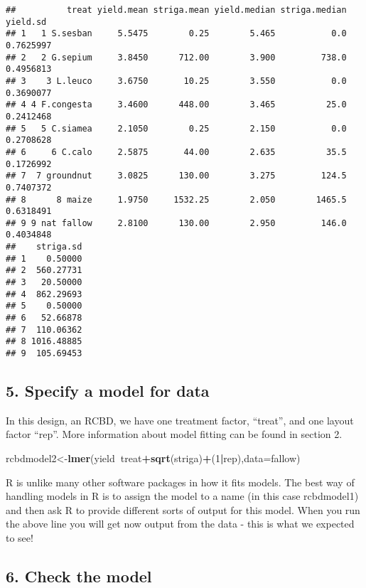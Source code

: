 \documentclass[]{book}
\newenvironment{Shaded}{\begin{snugshade}}{\end{snugshade}}
\newcommand{\KeywordTok}[1]{\textcolor[rgb]{0.13,0.29,0.53}{\textbf{#1}}}
\newcommand{\DataTypeTok}[1]{\textcolor[rgb]{0.13,0.29,0.53}{#1}}
\newcommand{\DecValTok}[1]{\textcolor[rgb]{0.00,0.00,0.81}{#1}}
\newcommand{\OperatorTok}[1]{\textcolor[rgb]{0.81,0.36,0.00}{\textbf{#1}}}
\newcommand{\NormalTok}[1]{#1}
\theoremstyle{definition}
\theoremstyle{definition}
\theoremstyle{definition}
\theoremstyle{remark}
\begin{document}
\begin{verbatim}
##          treat yield.mean striga.mean yield.median striga.median  yield.sd
## 1   1 S.sesban     5.5475        0.25        5.465           0.0 0.7625997
## 2   2 G.sepium     3.8450      712.00        3.900         738.0 0.4956813
## 3    3 L.leuco     3.6750       10.25        3.550           0.0 0.3690077
## 4 4 F.congesta     3.4600      448.00        3.465          25.0 0.2412468
## 5   5 C.siamea     2.1050        0.25        2.150           0.0 0.2708628
## 6     6 C.calo     2.5875       44.00        2.635          35.5 0.1726992
## 7  7 groundnut     3.0825      130.00        3.275         124.5 0.7407372
## 8      8 maize     1.9750     1532.25        2.050        1465.5 0.6318491
## 9 9 nat fallow     2.8100      130.00        2.950         146.0 0.4034848
##    striga.sd
## 1    0.50000
## 2  560.27731
## 3   20.50000
## 4  862.29693
## 5    0.50000
## 6   52.66878
## 7  110.06362
## 8 1016.48885
## 9  105.69453
\end{verbatim}

\subsection{5. Specify a model for
data}\label{specify-a-model-for-data-2}

In this design, an RCBD, we have one treatment factor, ``treat'', and
one layout factor ``rep''. More information about model fitting can be
found in section 2.

\begin{Shaded}
\begin{Highlighting}[]
\NormalTok{rcbdmodel2<-}\KeywordTok{lmer}\NormalTok{(yield}\OperatorTok{~}\NormalTok{treat}\OperatorTok{+}\KeywordTok{sqrt}\NormalTok{(striga)}\OperatorTok{+}\NormalTok{(}\DecValTok{1}\OperatorTok{|}\NormalTok{rep),}\DataTypeTok{data=}\NormalTok{fallow)}
\end{Highlighting}
\end{Shaded}

R is unlike many other software packages in how it fits models. The best
way of handling models in R is to assign the model to a name (in this
case rcbdmodel1) and then ask R to provide different sorts of output for
this model. When you run the above line you will get now output from the
data - this is what we expected to see!

\subsection{6. Check the model}\label{check-the-model-2}
\end{document}
